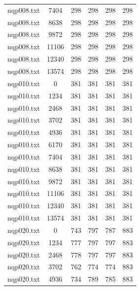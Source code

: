 \documentclass[12pt]{article}
\begin{document}
{\begin{longtable}{c|c|cccc}
		nqp008.txt    &   7404    &   298    &   298    &   298    & 298        \\
		nqp008.txt    &   8638    &   298    &   298    &   298    & 298        \\
		nqp008.txt    &   9872    &   298    &   298    &   298    & 298        \\
		nqp008.txt    &   11106   &   298    &   298    &   298    & 298        \\
		nqp008.txt    &   12340   &   298    &   298    &   298    & 298        \\
		nqp008.txt    &   13574   &   298    &   298    &   298    & 298        \\ \hline
		nqp010.txt    &   0       &   381    &   381    &   381    & 381        \\
		nqp010.txt    &   1234    &   381    &   381    &   381    & 381        \\
		nqp010.txt    &   2468    &   381    &   381    &   381    & 381        \\
		nqp010.txt    &   3702    &   381    &   381    &   381    & 381        \\
		nqp010.txt    &   4936    &   381    &   381    &   381    & 381        \\
		nqp010.txt    &   6170    &   381    &   381    &   381    & 381        \\
		nqp010.txt    &   7404    &   381    &   381    &   381    & 381        \\
		nqp010.txt    &   8638    &   381    &   381    &   381    & 381        \\
		nqp010.txt    &   9872    &   381    &   381    &   381    & 381        \\
		nqp010.txt    &   11106   &   381    &   381    &   381    & 381        \\
		nqp010.txt    &   12340   &   381    &   381    &   381    & 381        \\
		nqp010.txt    &   13574   &   381    &   381    &   381    & 381        \\ \hline
		nqp020.txt    &   0       &   743    &   797    &   787    & 883        \\
		nqp020.txt    &   1234    &   777    &   797    &   797    & 883        \\
		nqp020.txt    &   2468    &   778    &   797    &   797    & 883        \\
		nqp020.txt    &   3702    &   762    &   774    &   774    & 883        \\
		nqp020.txt    &   4936    &   734    &   789    &   785    & 883        \\

\end{longtable}}
\end{document}

